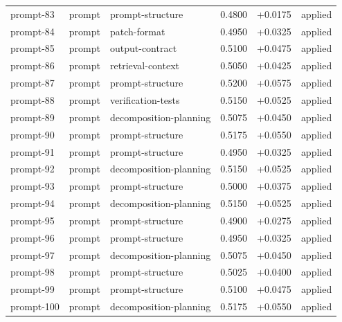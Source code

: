 \begin{center}
\begin{longtable}{llp{5.2cm}rrl}
prompt-83 & prompt & prompt-structure & 0.4800 & +0.0175 & applied \\
prompt-84 & prompt & patch-format & 0.4950 & +0.0325 & applied \\
prompt-85 & prompt & output-contract & 0.5100 & +0.0475 & applied \\
prompt-86 & prompt & retrieval-context & 0.5050 & +0.0425 & applied \\
prompt-87 & prompt & prompt-structure & 0.5200 & +0.0575 & applied \\
prompt-88 & prompt & verification-tests & 0.5150 & +0.0525 & applied \\
prompt-89 & prompt & decomposition-planning & 0.5075 & +0.0450 & applied \\
prompt-90 & prompt & prompt-structure & 0.5175 & +0.0550 & applied \\
prompt-91 & prompt & prompt-structure & 0.4950 & +0.0325 & applied \\
prompt-92 & prompt & decomposition-planning & 0.5150 & +0.0525 & applied \\
prompt-93 & prompt & prompt-structure & 0.5000 & +0.0375 & applied \\
prompt-94 & prompt & decomposition-planning & 0.5150 & +0.0525 & applied \\
prompt-95 & prompt & prompt-structure & 0.4900 & +0.0275 & applied \\
prompt-96 & prompt & prompt-structure & 0.4950 & +0.0325 & applied \\
prompt-97 & prompt & decomposition-planning & 0.5075 & +0.0450 & applied \\
prompt-98 & prompt & prompt-structure & 0.5025 & +0.0400 & applied \\
prompt-99 & prompt & prompt-structure & 0.5100 & +0.0475 & applied \\
prompt-100 & prompt & decomposition-planning & 0.5175 & +0.0550 & applied \\
\bottomrule\end{longtable}\end{center}
\clearpage
